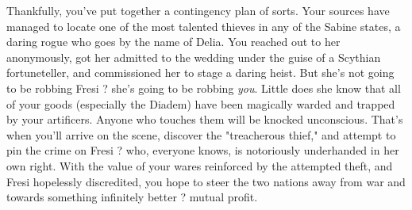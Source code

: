 \documentclass[char]{Kos}
\begin{document}
Thankfully, you've put together a contingency plan of sorts. Your sources have managed to locate one of the most talented thieves in any of the Sabine states, a daring rogue who goes by the name of Delia. You reached out to her anonymously, got her admitted to the wedding under the guise of a Scythian fortuneteller, and commissioned her to stage a daring heist. But she's not going to be robbing Fresi ? she's going to be robbing \textit{you}. Little does she know that all of your goods (especially the Diadem) have been magically warded and trapped by your artificers. Anyone who touches them will be knocked unconscious. That's when you'll arrive on the scene, discover the "treacherous thief," and attempt to pin the crime on Fresi ? who, everyone knows, is notoriously underhanded in her own right. With the value of your wares reinforced by the attempted theft, and Fresi hopelessly discredited, you hope to steer the two nations away from war and towards something infinitely better ? mutual profit.
\end{document}
